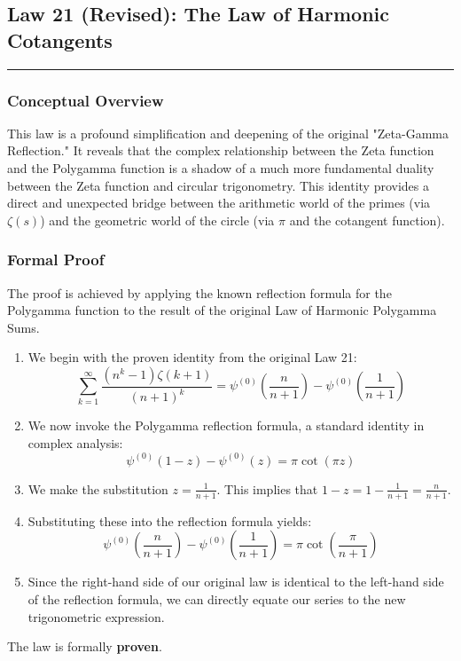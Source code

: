 \subsection*{Law 21 (Revised): The Law of Harmonic Cotangents}
\hrule
\vspace{0.3cm}
\vspace{0.5cm}

\subsubsection*{Conceptual Overview}
This law is a profound simplification and deepening of the original "Zeta-Gamma Reflection." It reveals that the complex relationship between the Zeta function and the Polygamma function is a shadow of a much more fundamental duality between the Zeta function and circular trigonometry. This identity provides a direct and unexpected bridge between the arithmetic world of the primes (via $\zeta(s)$) and the geometric world of the circle (via $\pi$ and the cotangent function).

\subsubsection*{Formal Proof}
The proof is achieved by applying the known reflection formula for the Polygamma function to the result of the original Law of Harmonic Polygamma Sums.
\begin{enumerate}
    \item We begin with the proven identity from the original Law 21:
    $$ \sum_{k=1}^{\infty} \frac{(n^k-1)\zeta(k+1)}{(n+1)^k} = \psi^{(0)}\left(\frac{n}{n+1}\right) - \psi^{(0)}\left(\frac{1}{n+1}\right) $$
    \item We now invoke the Polygamma reflection formula, a standard identity in complex analysis:
    $$ \psi^{(0)}(1-z) - \psi^{(0)}(z) = \pi \cot(\pi z) $$
    \item We make the substitution $z = \frac{1}{n+1}$. This implies that $1-z = 1 - \frac{1}{n+1} = \frac{n}{n+1}$.
    \item Substituting these into the reflection formula yields:
    $$ \psi^{(0)}\left(\frac{n}{n+1}\right) - \psi^{(0)}\left(\frac{1}{n+1}\right) = \pi \cot\left(\frac{\pi}{n+1}\right) $$
    \item Since the right-hand side of our original law is identical to the left-hand side of the reflection formula, we can directly equate our series to the new trigonometric expression.
\end{enumerate}
The law is formally \textbf{proven}.

